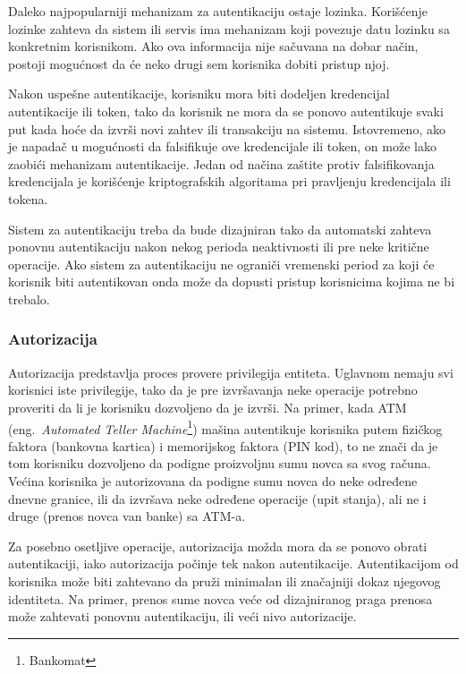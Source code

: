 \documentclass[a4paper]{article}
\begin{document}
Daleko najpopularniji mehanizam za autentikaciju ostaje lozinka. Korišćenje lozinke zahteva da sistem ili servis 
ima mehanizam koji povezuje datu lozinku sa konkretnim korisnikom. Ako ova informacija nije sačuvana na dobar 
način, postoji mogućnost da će neko drugi sem korisnika dobiti pristup njoj.

Nakon uspešne autentikacije, korisniku mora biti 
dodeljen kredencijal autentikacije ili token, tako da korisnik 
ne mora da se ponovo autentikuje svaki put kada hoće da izvrši novi zahtev ili transakciju na sistemu. 
Istovremeno, ako je napadač u mogućnosti da falsifikuje ove kredencijale ili token, on može lako zaobići 
mehanizam autentikacije. Jedan od načina zaštite protiv falsifikovanja kredencijala je korišćenje 
kriptografskih algoritama pri pravljenju kredencijala ili tokena.

Sistem za autentikaciju treba da bude dizajniran tako da automatski zahteva ponovnu autentikaciju nakon nekog 
perioda neaktivnosti ili pre neke kritične operacije.
Ako sistem za autentikaciju ne ograniči vremenski period za koji će korisnik biti autentikovan onda može 
da dopusti pristup korisnicima kojima ne bi trebalo.

\subsubsection{Autorizacija}

Autorizacija predstavlja proces provere privilegija entiteta. Uglavnom nemaju svi korisnici iste privilegije, tako da je pre izvršavanja neke operacije potrebno proveriti da li je korisniku dozvoljeno da je izvrši. 
Na primer, kada ATM (eng.~{\em Automated Teller Machine}\footnote{Bankomat}) mašina autentikuje korisnika putem fizičkog faktora (bankovna kartica) i memorijskog faktora (PIN kod),
to ne znači da je tom korisniku dozvoljeno da podigne proizvoljnu sumu novca sa svog računa. Većina korisnika je autorizovana 
da podigne sumu novca do neke određene dnevne granice, ili da izvršava neke određene operacije (upit stanja), 
ali ne i druge (prenos novca van banke) sa ATM-a.
 
Za posebno osetljive operacije, autorizacija možda mora da se ponovo obrati autentikaciji, iako autorizacija počinje tek 
nakon autentikacije. Autentikacijom od korisnika može biti zahtevano da pruži minimalan ili značajniji dokaz njegovog identiteta. 
Na primer, prenos sume novca veće od dizajniranog praga prenosa može zahtevati ponovnu autentikaciju, ili veći nivo autorizacije.
\end{document}
